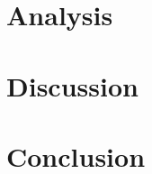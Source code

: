 \documentclass[english, a4paper, 12pt, twoside]{article}
\numberwithin{equation}{section} %
\begin{document}
\section{Analysis}
    
\clearpage

\section{Discussion}
    
\clearpage

\section{Conclusion}
    
\clearpage

\newpage
\renewcommand\refname{References} %
{ %
\printbibliography %
}

\newpage
\appendix
\appendixpage
\noappendicestocpagenum
\addappheadtotoc

    
\clearpage
\end{document}
